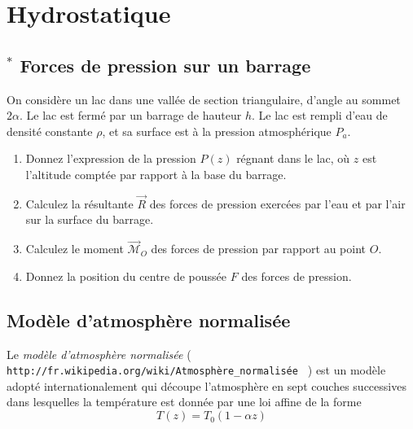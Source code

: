 
\section{Hydrostatique}


\setcounter{subsection}{-1}
\subsection{$^*$ Forces de pression sur un barrage}

 

On considère un lac dans une vallée de section triangulaire,
d'angle au sommet $2\alpha$.
Le lac est fermé par un barrage de hauteur 
$h$. Le lac est rempli
d'eau de densité constante $\rho$, et sa surface est à la pression 
atmosphérique $P_a$.


\begin{enumerate}

\item Donnez l'expression de la pression $P(z)$ régnant dans le lac, où $z$ est l'altitude 
comptée par rapport à la base du barrage.

\item Calculez la résultante $\vec R$ des forces de pression exercées par l'eau 
et par l'air sur la surface du barrage.

\item Calculez le moment $\vec{\mathcal M}_O$ des forces de pression par
rapport au point $O$.

\item Donnez la position du centre de poussée $F$ des forces de pression.

\end{enumerate}



\subsection{Modèle d'atmosphère normalisée}

Le {\em modèle d'atmosphère normalisée }  ( \verb| http://fr.wikipedia.org/wiki/Atmosphère_normalisée | )
est un modèle adopté internationalement qui découpe l'atmosphère en sept couches successives
dans lesquelles la température est donnée par une loi affine de la forme 
$$T(z) = T_0 ( 1 - \alpha z)$$

